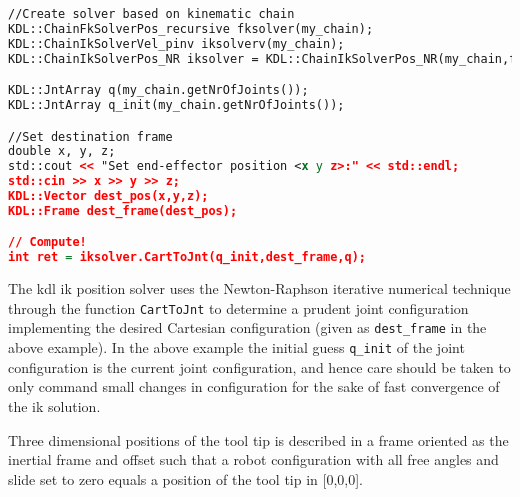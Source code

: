 \begin{lstlisting}[language=xml]
//Create solver based on kinematic chain
KDL::ChainFkSolverPos_recursive fksolver(my_chain);
KDL::ChainIkSolverVel_pinv iksolverv(my_chain);
KDL::ChainIkSolverPos_NR iksolver = KDL::ChainIkSolverPos_NR(my_chain,fksolver,iksolverv,100,1e-6);

KDL::JntArray q(my_chain.getNrOfJoints());
KDL::JntArray q_init(my_chain.getNrOfJoints());

//Set destination frame
double x, y, z;
std::cout << "Set end-effector position <x y z>:" << std::endl;
std::cin >> x >> y >> z;
KDL::Vector dest_pos(x,y,z);
KDL::Frame dest_frame(dest_pos);

// Compute!
int ret = iksolver.CartToJnt(q_init,dest_frame,q);
\end{lstlisting}

The \gls{kdl} \gls{ik} position solver uses the Newton-Raphson iterative numerical technique through the function \texttt{CartToJnt} to determine a prudent joint configuration implementing the desired Cartesian configuration (given as \texttt{dest\_frame} in the above example). In the above example the initial guess \texttt{q\_init} of the joint configuration is the current joint configuration, and hence care should be taken to only command small changes in configuration for the sake of fast convergence of the \gls{ik} solution.


Three dimensional positions of the tool tip is described in a frame oriented as the inertial frame and offset such that a robot configuration with all free angles and slide set to zero equals a position of the tool tip in [0,0,0].




